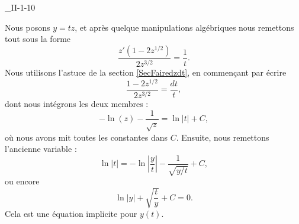 \begin{corrige}{_II-1-10}
\begin{enumerate}
Nous posons $y=tz$, et après quelque manipulations algébriques nous remettons tout sous la forme
\begin{equation}		\label{EqII110EqPourz}
	\frac{ z'(1-2z^{1/2}) }{ 2z^{3/2} }=\frac{1}{ t }.
\end{equation}
Nous utilisons l'astuce de la section \ref{SecFairedzdt}, en commençant par écrire
\begin{equation}
	\frac{ 1-2z^{1/2} }{ 2z^{3/2} }=\frac{ dt }{ t },
\end{equation}
dont nous intégrons les deux membres :
\begin{equation}
	-\ln(z)-\frac{1}{ \sqrt{z} }=\ln| t |+C,
\end{equation}
où nous avons mit toutes les constantes dans $C$.
Ensuite, nous remettons l'ancienne variable :
\begin{equation}
	\ln| t |=-\ln| \frac{ y }{ t } |-\frac{1}{ \sqrt{y/t} }+C,
\end{equation}
ou encore
\begin{equation}
	\ln| y |+\sqrt{\frac{ t }{ y }}+C=0.
\end{equation}
Cela est une équation implicite pour $y(t)$.

\end{enumerate}


\end{corrige}
